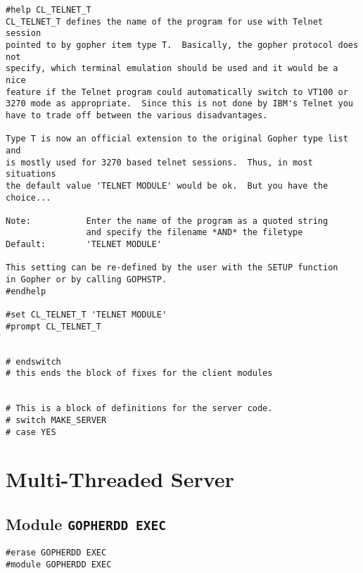 \def\LPtopD{{\sl{help}} {\tt CL\_TELNET\_T}}

\def\LPtopF{~}

\begin{verbatim}
#help CL_TELNET_T
CL_TELNET_T defines the name of the program for use with Telnet session
pointed to by gopher item type T.  Basically, the gopher protocol does not
specify, which terminal emulation should be used and it would be a nice
feature if the Telnet program could automatically switch to VT100 or
3270 mode as appropriate.  Since this is not done by IBM's Telnet you
have to trade off between the various disadvantages.

Type T is now an official extension to the original Gopher type list and
is mostly used for 3270 based telnet sessions.  Thus, in most situations
the default value 'TELNET MODULE' would be ok.  But you have the choice...

Note:           Enter the name of the program as a quoted string
                and specify the filename *AND* the filetype
Default:        'TELNET MODULE'

This setting can be re-defined by the user with the SETUP function
in Gopher or by calling GOPHSTP.
#endhelp

#set CL_TELNET_T 'TELNET MODULE'
#prompt CL_TELNET_T


# endswitch
# this ends the block of fixes for the client modules


# This is a block of definitions for the server code.
# switch MAKE_SERVER
# case YES
\end{verbatim}

\section{Multi-Threaded Server}

\def\LPtopC{Multi-Threaded Server}

\def\LPtopD{~}

\def\LPtopF{~}

\subsection{Module {\tt GOPHERDD EXEC}}

\def\LPtopD{Module {\tt GOPHERDD EXEC}}

\def\LPtopF{~}

\begin{verbatim}
#erase GOPHERDD EXEC
#module GOPHERDD EXEC
\end{verbatim}

